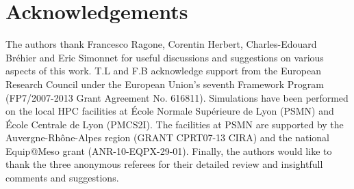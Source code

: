 \documentclass{jfm}
\begin{document}
\section{Acknowledgements}
The authors thank Francesco Ragone, Corentin Herbert, Charles-Edouard Bréhier and Eric Simonnet for useful discussions and suggestions on various aspects of this work.
T.L and F.B acknowledge support from the European Research Council under the European Union's seventh Framework Program (FP7/2007-2013 Grant Agreement No. 616811).
Simulations have been performed on the local HPC facilities at École Normale Supérieure de Lyon (PSMN) and École Centrale de Lyon (PMCS2I).
The facilities at PSMN are supported by the Auvergne-Rhône-Alpes region (GRANT CPRT07-13 CIRA) and the national Equip@Meso grant (ANR-10-EQPX-29-01).
Finally, the authors would like to thank the three anonymous referees for their detailed review and insightfull comments and suggestions.

\appendix









\end{document}
